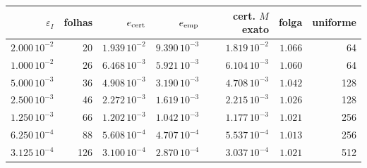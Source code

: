 \begin{tabular}{rrrrrrr}
\toprule
$\varepsilon_I$ & folhas & $e_{\rm cert}$ & $e_{\rm emp}$ & cert. $M$ exato & folga & uniforme\\
\midrule
$2.000\,10^{-2}$ & 20 & $1.939\,10^{-2}$ & $9.390\,10^{-3}$ & $1.819\,10^{-2}$ & $1.066$ & 64\\
$1.000\,10^{-2}$ & 26 & $6.468\,10^{-3}$ & $5.921\,10^{-3}$ & $6.104\,10^{-3}$ & $1.060$ & 64\\
$5.000\,10^{-3}$ & 36 & $4.908\,10^{-3}$ & $3.190\,10^{-3}$ & $4.708\,10^{-3}$ & $1.042$ & 128\\
$2.500\,10^{-3}$ & 46 & $2.272\,10^{-3}$ & $1.619\,10^{-3}$ & $2.215\,10^{-3}$ & $1.026$ & 128\\
$1.250\,10^{-3}$ & 66 & $1.202\,10^{-3}$ & $1.042\,10^{-3}$ & $1.177\,10^{-3}$ & $1.021$ & 256\\
$6.250\,10^{-4}$ & 88 & $5.608\,10^{-4}$ & $4.707\,10^{-4}$ & $5.537\,10^{-4}$ & $1.013$ & 256\\
$3.125\,10^{-4}$ & 126 & $3.100\,10^{-4}$ & $2.870\,10^{-4}$ & $3.037\,10^{-4}$ & $1.021$ & 512\\
\bottomrule
\end{tabular}
